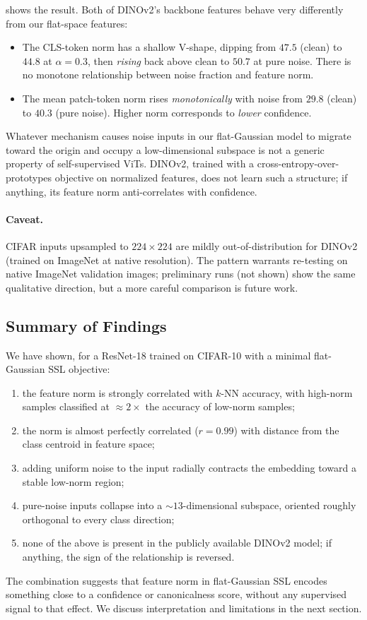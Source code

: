  shows the result. Both of DINOv2's backbone features behave very differently from our flat-space features:
\begin{itemize}
    \item The CLS-token norm has a shallow V-shape, dipping from $47.5$ (clean) to $44.8$ at $\alpha = 0.3$, then \emph{rising} back above clean to $50.7$ at pure noise. There is no monotone relationship between noise fraction and feature norm.
    \item The mean patch-token norm rises \emph{monotonically} with noise from $29.8$ (clean) to $40.3$ (pure noise). Higher norm corresponds to \emph{lower} confidence.
\end{itemize}

Whatever mechanism causes noise inputs in our flat-Gaussian model to migrate toward the origin and occupy a low-dimensional subspace is not a generic property of self-supervised ViTs. DINOv2, trained with a cross-entropy-over-prototypes objective on normalized features, does not learn such a structure; if anything, its feature norm anti-correlates with confidence.

\paragraph{Caveat.} CIFAR inputs upsampled to $224 \times 224$ are mildly out-of-distribution for DINOv2 (trained on ImageNet at native resolution). The pattern warrants re-testing on native ImageNet validation images; preliminary runs (not shown) show the same qualitative direction, but a more careful comparison is future work.

\subsection{Summary of Findings}

We have shown, for a ResNet-18 trained on CIFAR-10 with a minimal flat-Gaussian SSL objective:
\begin{enumerate}
    \item the feature norm is strongly correlated with $k$-NN accuracy, with high-norm samples classified at $\approx 2\times$ the accuracy of low-norm samples;
    \item the norm is almost perfectly correlated ($r = 0.99$) with distance from the class centroid in feature space;
    \item adding uniform noise to the input radially contracts the embedding toward a stable low-norm region;
    \item pure-noise inputs collapse into a $\sim 13$-dimensional subspace, oriented roughly orthogonal to every class direction;
    \item none of the above is present in the publicly available DINOv2 model; if anything, the sign of the relationship is reversed.
\end{enumerate}

The combination suggests that feature norm in flat-Gaussian SSL encodes something close to a confidence or canonicalness score, without any supervised signal to that effect. We discuss interpretation and limitations in the next section.
